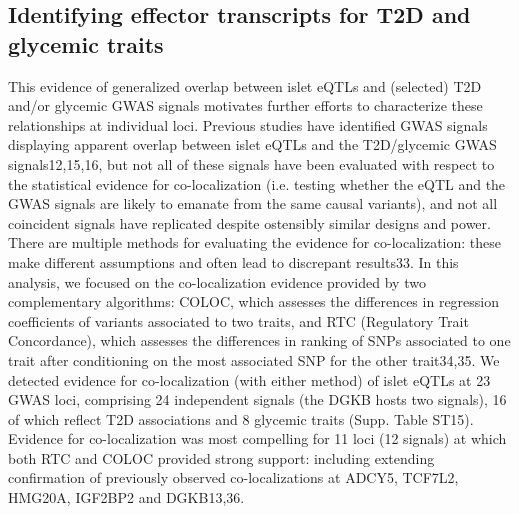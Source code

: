 \subsection{Identifying effector transcripts for T2D and glycemic traits}
This evidence of generalized overlap between islet eQTLs and (selected) T2D and/or glycemic GWAS signals motivates further efforts to characterize these relationships at individual loci. Previous studies have identified GWAS signals displaying apparent overlap between islet eQTLs and the T2D/glycemic GWAS signals12,15,16, but not all of these signals have been evaluated with respect to the statistical evidence for co-localization (i.e. testing whether the eQTL and the GWAS signals are likely to emanate from the same causal variants), and not all coincident signals have replicated despite ostensibly similar designs and power.
There are multiple methods for evaluating the evidence for co-localization: these make different assumptions and often lead to discrepant results33. In this analysis, we focused on the co-localization evidence provided by two complementary algorithms: COLOC, which assesses the differences in regression coefficients of variants associated to two traits, and RTC (Regulatory Trait Concordance), which assesses the differences in ranking of SNPs associated to one trait after conditioning on the most associated SNP for the other trait34,35. We detected evidence for co-localization (with either method) of islet eQTLs at 23 GWAS loci, comprising 24 independent signals (the DGKB hosts two signals), 16 of which reflect T2D associations and 8 glycemic traits (Supp. Table ST15). Evidence for co-localization was most compelling for 11 loci (12 signals) at which both RTC and COLOC provided strong support: including extending confirmation of previously observed co-localizations at ADCY5, TCF7L2, HMG20A, IGF2BP2 and DGKB13,36. \\
    
